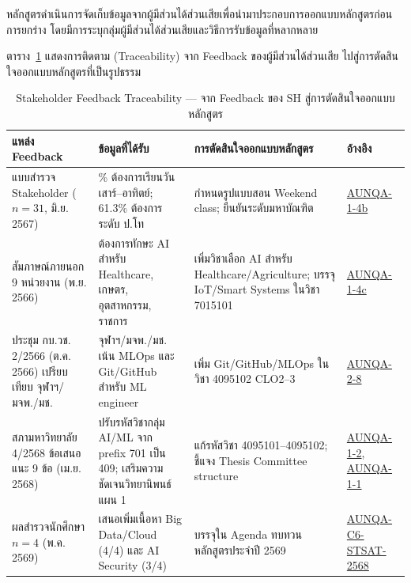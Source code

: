 หลักสูตรดำเนินการจัดเก็บข้อมูลจากผู้มีส่วนได้ส่วนเสียเพื่อนำมาประกอบการออกแบบหลักสูตรก่อนการยกร่าง โดยมีการระบุกลุ่มผู้มีส่วนได้ส่วนเสียและวิธีการรับข้อมูลที่หลากหลาย

ตาราง~\ref{tbl:sh_feedback_trace} แสดงการติดตาม (Traceability) จาก Feedback ของผู้มีส่วนได้ส่วนเสีย ไปสู่การตัดสินใจออกแบบหลักสูตรที่เป็นรูปธรรม

\begin{table}[H]
  \centering
  \caption{Stakeholder Feedback Traceability --- จาก Feedback ของ SH สู่การตัดสินใจออกแบบหลักสูตร}
  \label{tbl:sh_feedback_trace}
  \begingroup
  \footnotesize
  \setlength{\tabcolsep}{3pt}
  \renewcommand{\arraystretch}{1.2}
  \begin{tabularx}{\linewidth}{|>{\raggedright\arraybackslash}p{2.5cm}|>{\raggedright\arraybackslash}X|>{\raggedright\arraybackslash}X|>{\raggedright\arraybackslash}p{2.2cm}|}
    \hline
    \textbf{แหล่ง Feedback} & \textbf{ข้อมูลที่ได้รับ} & \textbf{การตัดสินใจออกแบบหลักสูตร} & \textbf{อ้างอิง} \\
    \hline
    แบบสำรวจ Stakeholder ($n=31$, มิ.ย. 2567) & 83.9\% ต้องการเรียนวันเสาร์--อาทิตย์; 61.3\% ต้องการระดับ ป.โท & กำหนดรูปแบบสอน Weekend class; ยืนยันระดับมหาบัณฑิต & \hyperlink{ref:AUNQA-1-4b}{AUNQA-1-4b} \\
    \hline
    สัมภาษณ์ภายนอก 9 หน่วยงาน (พ.ย. 2566) & ต้องการทักษะ AI สำหรับ Healthcare, เกษตร, อุตสาหกรรม, ราชการ & เพิ่มวิชาเลือก AI สำหรับ Healthcare/Agriculture; บรรจุ IoT/Smart Systems ในวิชา 7015101 & \hyperlink{ref:AUNQA-1-4c}{AUNQA-1-4c} \\
    \hline
    ประชุม กบ.วช. 2/2566 (ต.ค. 2566) เปรียบเทียบ จุฬาฯ/มจพ./มช. & จุฬาฯ/มจพ./มช. เน้น MLOps และ Git/GitHub สำหรับ ML engineer & เพิ่ม Git/GitHub/MLOps ในวิชา 4095102 CLO2--3 & \hyperlink{ref:AUNQA-2-8}{AUNQA-2-8} \\
    \hline
    สภามหาวิทยาลัย 4/2568 ข้อเสนอแนะ 9 ข้อ (เม.ย. 2568) & ปรับรหัสวิชากลุ่ม AI/ML จาก prefix 701 เป็น 409; เสริมความชัดเจนวิทยานิพนธ์แผน 1 & แก้รหัสวิชา 4095101--4095102; ชี้แจง Thesis Committee structure & \hyperlink{ref:AUNQA-1-2}{AUNQA-1-2}, \hyperlink{ref:AUNQA-1-1}{AUNQA-1-1} \\
    \hline
    ผลสำรวจนักศึกษา $n=4$ (พ.ค. 2569) & เสนอเพิ่มเนื้อหา Big Data/Cloud (4/4) และ AI Security (3/4) & บรรจุใน Agenda ทบทวนหลักสูตรประจำปี 2569 & \hyperlink{ref:AUNQA-C6-STSAT-2568}{AUNQA-C6-STSAT-2568} \\
    \hline
  \end{tabularx}
  \endgroup
\end{table}

